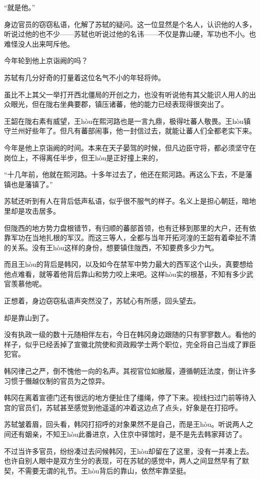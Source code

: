“就是他。”

身边官员的窃窃私语，化解了苏轼的疑问。这一位显然是个名人，认识他的人多，听说过他的也不少——苏轼也听说过他的名讳——不仅是靠山硬，军功也不小。也难怪没人出来呵斥他。

今年轮到他上京诣阙的吗？

苏轼有几分好奇的打量着这位名气不小的年轻将帅。

虽比不上其父一举打开西北僵局的开创之力，也没有听说他有其父能识人用人的出众眼光，但在陇右坐典要郡，镇压诸蕃，他的能力已经表现得很突出了。

王韶在陇右素有威望，王hòu在熙河路也是一言九鼎，极得吐蕃人敬畏。王hòu镇守兰州好些年了。但凡有蕃部闹事，他一封信过去，就能让蕃人们全都老实下来。

今年是他上京诣阙的时间。本来在天子晏驾的时候，但凡边臣守将，都必须坚守在岗位上，不得离任半步，但王hòu是正好撞上来的，

“十几年前，他就在熙河路。十多年过去了，他还在熙河路。再这么下去，不是藩镇也是藩镇了。”

苏轼还听到有人在背后低声私语，似乎很不服气的样子。名义上是担心朝廷，暗地里却是攻击居多。

但陇西的地方势力盘根错节，有归顺的蕃部首领，也有迁移到那里的大户，还有依靠军功在当地扎根的军汉。而这三等人，全都与当年开拓河湟的王韶有着牵扯不清的关系。没有王hòu这样的身份，想要镇住陇西，不知要费多少力气。

而且王hòu的背后是韩冈，以及如今在禁军中势力最大的西军这个山头，真要想给他点难看，就等着他背后靠山和势力咬上来吧。这样hòu实的根基，不知有多少武官羡慕他呢。

正想着，身边窃窃私语声突然没了，苏轼心有所感，回头望去。

却是靠山到了。

没有执政一级的数十元随相伴左右，今日在韩冈身边跟随的只有寥寥数人。看他的样子，似乎已经丢掉了宣徽北院使和资政殿学士两个职位，完全将自己当成了罪臣犯官。

韩冈律己之严，倒不愧他一向的名声。其视官位如敝履，遵循朝廷法度，倒让许多习惯于僭越仪制的官员为之惊异。

韩冈在离着宣德门还有很远的地方便扯住了缰绳，停了下来。视线扫过门前等待入宫的官员们，苏轼甚至感觉到他遥遥的冲着这边点了点头，好象是在打招呼。

苏轼皱着眉，回头看，韩冈打招呼的对象果然不是自己，而是王hòu。听说两人之间还有姻亲，不知王hòu此番进京，入住京中驿馆时，是不是先去韩家拜访了。

不过当许多官员，纷纷凑过去问候韩冈，王hòu却留在了这里，没有一并凑上去。也许自别人眼中是双方生分的表现，可在苏轼的感觉中，两人之间显然早有了默契，不需要无谓的礼节。王hòu背后的靠山，依然牢靠坚挺。

